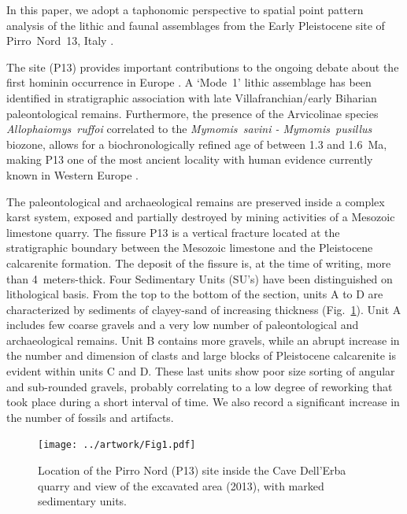 \documentclass[review,authoryear]{elsarticle} %
\begin{document}
In this paper, we adopt a taphonomic perspective to spatial point pattern analysis of the lithic and faunal assemblages from the Early Pleistocene site of Pirro~Nord~13, Italy \citep{Arzarello2007,Arzarello2009,Arzarello2012,Arzarello2010}.

The site (P13) provides important contributions to the ongoing debate about the first hominin occurrence in Europe \citep{Carbonell2008,Crochet2009,Despriee2006,Despriee2009,Despriee2010,Lumley1988,Pares2006,Toro-Moyano2011,Toro-Moyano2009,Toro-Moyano2013}. A ‘Mode~1’ lithic assemblage has been identified in stratigraphic association with late Villafranchian/early Biharian paleontological remains. Furthermore, the presence of the Arvicolinae species \emph{Allophaiomys~ruffoi} correlated to the \emph{Mymomis~savini - Mymomis~pusillus} biozone, allows for a  biochronologically refined age of between 1.3 and 1.6~Ma, making P13 one of the most ancient locality with human evidence currently known in Western Europe \citep{Lopez-Garcia2015}.

The paleontological and archaeological remains are preserved inside a complex karst system, exposed and partially destroyed by mining activities of a Mesozoic limestone quarry. The fissure P13 is a vertical fracture located at the stratigraphic boundary between the Mesozoic limestone and the Pleistocene calcarenite formation. The deposit of the fissure is, at the time of writing, more than 4~meters-thick. Four Sedimentary Units (SU's) have been distinguished on lithological basis. From the top to the bottom of the section, units A to D are characterized by sediments of clayey-sand of increasing thickness (Fig.~\ref{fig:1}). Unit A includes few coarse gravels and a very low number of paleontological and archaeological remains. Unit B contains more gravels, while an abrupt increase in the number and dimension of clasts and large blocks of Pleistocene calcarenite is evident within units C and D. These last units show poor size sorting of angular and sub-rounded gravels, probably correlating to a low degree of reworking that took place during a short interval of time. We also record a significant increase in the number of fossils and artifacts.

\begin{figure}
  \centering
  \texttt{[image: ../artwork/Fig1.pdf]}
  \caption{Location of the Pirro Nord (P13) site inside the Cave Dell'Erba quarry and view of the excavated area (2013), with marked sedimentary units.}
  \label{fig:1}
\end{figure}
\end{document}
